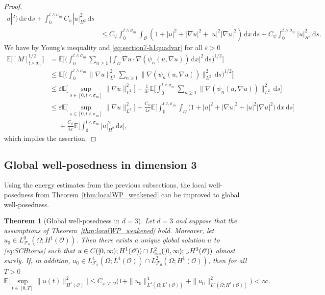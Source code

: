 \documentclass[reqno]{amsart}
\newtheorem{theorem}[Satz]{Theorem}
\newcommand{\E}{\mathbb{E}}
\newcommand{\F}{\mathscr{F}}
\newcommand{\sO}{\mathscr{O}}
\newcommand{\1}{\mathbf{1}}
\newcommand{\grad}{\nabla}
\newcommand{\ds}{\,\mathrm{d}s}
\newcommand{\dx}{\,\mathrm{d}x}
\newcommand{\inttm}{\int_0^{t\wedge\sigma_m}}
\newcommand{\intsO}{\int_{\sO}}
\newcommand{\loc}{\textup{loc}}
\newcommand{\nH}{\ensuremath{\,_\nu H}}
\begin{document}
\begin{proof}
\begin{equation}
\begin{aligned}
     u|^2 \big)\dx \ds + \inttm C_\psi|u|_{H^2}^2 \ds \\
      &\le C_\psi \inttm  \intsO  (1+|u|^2+|\grad u|^2 + |u|^2|\grad u|^2)
       \dx \ds + C_\psi\inttm |u|_{H^2}^2 \ds.
     \end{aligned}
     \end{equation} We have by Young's inequality and \eqref{eq:section7-h1quadvar} for all $\varepsilon >0$
    \begin{align}
    \label{eq:H1estimateQuadrVar}
    \E\big[ [M]^{1/2}_{t\wedge \sigma_m}\big] &  =\E\Big[\Big(\inttm \sum_{n \geq 1} \Big|\intsO \grad u \cdot \grad (\psi_n(u,\grad u)) \dx \Big|^2 \ds\Big)^{1/2} \Big] \nonumber\\
    & \leq \E\Big[\Big(\inttm \|\grad u \|^2_{L^2} \sum_{n \geq 1} \|\grad (\psi_n(u,\grad u)) \|^2_{L^2} \ds\Big)^{1/2} \Big]\nonumber \\
    & \leq \varepsilon  \E\bigg[\sup_{s\in[0,t\wedge \sigma_m]}  \|\grad u \|^2_{L^2} \bigg] + \frac{1}{4\varepsilon} \E\Big[\inttm \sum_{n \geq 1} \|\grad (\psi_n(u,\grad u)) \|^2_{L^2} \ds \Big] \nonumber\\
    & \leq \varepsilon  \E\bigg[\sup_{s\in[0,t\wedge \sigma_m]}  \|\grad u \|^2_{L^2} \bigg]  + 
    \frac{C_\psi}{4\varepsilon}\E\Big[ \inttm  \intsO\big(1+|u|^2+|\grad u|^2 + |u|^2|\grad u|^2\big)\dx\ds\Big] \nonumber\\
    &  \phantom{\le } + \frac{C_\psi}{4\varepsilon}\E\Big[ \inttm   |u|_{H^2}^2 \ds\Big],
    \end{align}
    which implies the assertion. 
\end{proof}


\subsection{Global well-posedness in dimension 3}
\label{subsec:globalWPd3}



Using the energy estimates from the previous subsections, the local well-posedness from Theorem~\ref{thm:localWP_weakened} can be improved to global well-posedness.

\begin{theorem}[Global well-posedness in $d=3$] \label{thm:global_well_posedness_dim_3}
	Let $d=3$ and suppose that the assumptions of Theorem~\ref{thm:localWP_weakened} hold. Moreover, let $u_0\in L^0_{\F_0}(\Omega;H^1(\sO))$. Then there exists a unique global solution $u$ to \eqref{eq:SCHtorus} such that $u\in C([0,\infty);H^1(\sO))\cap L_{\loc}^2([0,\infty);\nH^3(\sO))$ almost surely. If, in addition, $u_0\in L_{\F_0}^4(\Omega;L^4(\sO))\cap L_{\F_0}^2(\Omega;H^1(\sO))$, then for all $T>0$
    \begin{equation}\label{eq:thm:global_well_posedness_dim_3:EnergyEstimate}
        \E\bigg[\sup_{t\in[0,T]}  \|u(t)\|^2_{H^1(\sO)}\bigg] \le C_{\psi,T,\sO}\big(1+\|u_0\|^4_{L^4(\Omega;L^4(\sO))}+\|u_0\|^2_{L^2(\Omega;H^1(\sO))}\big) < \infty.
    \end{equation}
\end{theorem}
\end{document}
